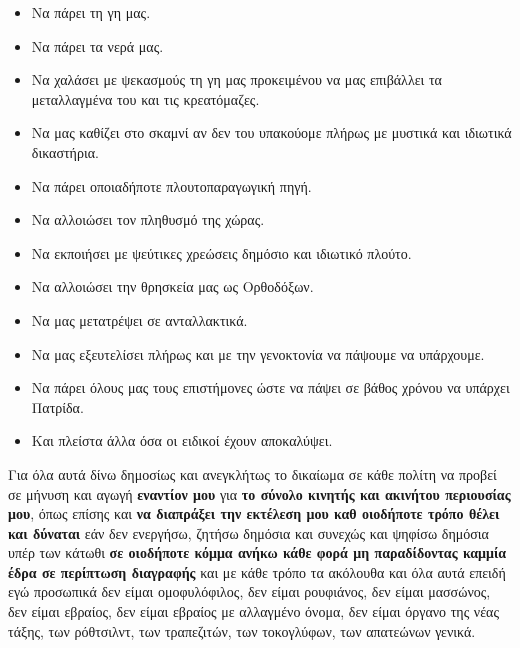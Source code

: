 \documentclass[a4paper]{article}
\begin{document}
\begin{itemize}
\end{itemize}

\begin{itemize}

\item Να πάρει τη γη μας.
\item Να πάρει τα νερά μας.
\item Να χαλάσει με ψεκασμούς τη γη μας προκειμένου να μας επιβάλλει τα μεταλλαγμένα του και τις κρεατόμαζες.
\item Να μας καθίζει στο σκαμνί αν δεν του υπακούομε πλήρως με μυστικά και ιδιωτικά δικαστήρια.
\item Να πάρει οποιαδήποτε πλουτοπαραγωγική πηγή.
\item Να αλλοιώσει τον πληθυσμό της χώρας.
\item Να εκποιήσει με ψεύτικες χρεώσεις δημόσιο και ιδιωτικό πλούτο.
\item Να αλλοιώσει την θρησκεία μας ως Ορθοδόξων.
\item Να μας μετατρέψει σε ανταλλακτικά.
\item Να μας εξευτελίσει πλήρως και με την γενοκτονία να πάψουμε να υπάρχουμε.
\item Να πάρει όλους μας τους επιστήμονες ώστε να πάψει σε βάθος χρόνου να υπάρχει Πατρίδα.
\item Και πλείστα άλλα όσα οι ειδικοί έχουν αποκαλύψει.
\end{itemize}


Για όλα αυτά δίνω δημοσίως και ανεγκλήτως το δικαίωμα σε κάθε πολίτη να προβεί σε μήνυση και αγωγή \textbf{εναντίον μου} για \textbf{το σύνολο κινητής και ακινήτου περιουσίας μου}, όπως επίσης και \textbf{να διαπράξει την εκτέλεση μου καθ οιοδήποτε τρόπο θέλει και δύναται} εάν δεν ενεργήσω, ζητήσω δημόσια και συνεχώς και ψηφίσω δημόσια υπέρ των κάτωθι \textbf{σε οιοδήποτε κόμμα ανήκω κάθε φορά μη παραδίδοντας καμμία έδρα σε περίπτωση διαγραφής} και με κάθε τρόπο τα ακόλουθα και όλα αυτά επειδή εγώ προσωπικά δεν είμαι ομοφυλόφιλος, δεν είμαι ρουφιάνος, δεν είμαι μασσώνος, δεν είμαι εβραίος, δεν είμαι εβραίος με αλλαγμένο όνομα, δεν είμαι όργανο της νέας τάξης, των ρόθτσιλντ, των τραπεζιτών, των τοκογλύφων, των απατεώνων γενικά.\par
\end{document}
